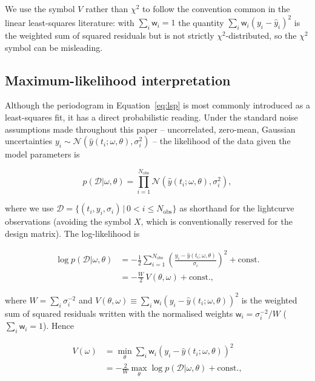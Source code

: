 \documentclass[apj]{emulateapj}
\newcommand{\wgt}{\mathsf{w}}  %
\begin{document}
We use the symbol $V$ rather than $\chi^2$ to follow the convention common in
the linear least-squares literature: with $\sum_i \wgt_i = 1$ the quantity
$\sum_i \wgt_i (y_i - \hat{y}_i)^2$ is the weighted sum of squared residuals but
is not strictly $\chi^2$-distributed, so the $\chi^2$ symbol can be misleading.



\subsection{Maximum-likelihood interpretation}
\label{sec:max-likelihood}

Although the periodogram in Equation~\ref{eq:lsp} is most commonly introduced
as a least-squares fit, it has a direct probabilistic reading. Under the
standard noise assumptions made throughout this paper -- uncorrelated, zero-mean,
Gaussian uncertainties $y_i \sim \mathcal{N}(\hat{y}(t_i; \omega, \theta), \sigma_i^2)$ --
the likelihood of the data given the model parameters is

\begin{equation}
    p(\mathcal{D}|\omega, \theta) = \prod_{i=1}^{N_{\mathrm{obs}}}\mathcal{N}(\hat{y}(t_i; \omega, \theta), \sigma^2_i),
\end{equation}

where we use $\mathcal{D} = \{(t_i, y_i, \sigma_i) \,|\, 0 < i \le N_{\mathrm{obs}}\}$ as shorthand for the lightcurve observations (avoiding the symbol $X$, which is conventionally reserved for the design matrix). The log-likelihood is

\begin{align}
    \log p(\mathcal{D}|\omega, \theta) &= -\frac{1}{2}\sum_{i=1}^{N_{\mathrm{obs}}}\left(\frac{y_i - \hat{y}(t_i; \omega, \theta)}{\sigma_i}\right)^2 + \mathrm{const.}\\
                                       &= -\frac{W}{2}\,V(\theta, \omega) + \mathrm{const.},
\end{align}

where $W = \sum_i \sigma_i^{-2}$ and
$V(\theta,\omega) \equiv \sum_i \wgt_i (y_i - \hat{y}(t_i; \omega, \theta))^2$ is
the weighted sum of squared residuals written with the normalised weights
$\wgt_i = \sigma_i^{-2}/W$ ($\sum_i \wgt_i = 1$). Hence

\begin{align}
    V(\omega) &= \min_{\theta} \sum_i \wgt_i (y_i - \hat{y}(t_i; \omega, \theta))^2\\
              &= -\frac{2}{W}\max_\theta \log p(\mathcal{D}|\omega, \theta) + \mathrm{const.},
\end{align}
\end{document}

